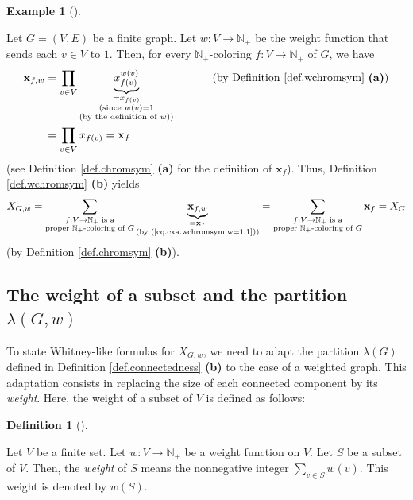 \documentclass[numbers=enddot,12pt,final,onecolumn,notitlepage]{scrartcl}%
\theoremstyle{definition}
\newtheorem{defi}[theo]{Definition}
\newenvironment{definition}[1][]
{\begin{defi}[#1]\begin{leftbar}}
{\end{leftbar}\end{defi}}
\newtheorem{exmp}[theo]{Example}
\newenvironment{example}[1][]
{\begin{exmp}[#1]\begin{leftbar}}
{\end{leftbar}\end{exmp}}
\let\sumnonlimits\sum
\let\prodnonlimits\prod
\renewcommand{\sum}{\sumnonlimits\limits}
\renewcommand{\prod}{\prodnonlimits\limits}
\begin{document}
\begin{example}
\label{exa.wchromsym.w=1}Let $G=\left(  V,E\right)  $ be a finite graph. Let
$w:V\rightarrow\mathbb{N}_{+}$ be the weight function that sends each $v\in V$
to $1$. Then, for every $\mathbb{N}_{+}$-coloring $f:V\rightarrow
\mathbb{N}_{+}$ of $G$, we have%
\begin{align}
\mathbf{x}_{f,w}  &  =\prod_{v\in V}\underbrace{x_{f\left(  v\right)
}^{w\left(  v\right)  }}_{\substack{=x_{f\left(  v\right)  }\\\text{(since
}w\left(  v\right)  =1\\\text{(by the definition of }w\text{))}}%
}\ \ \ \ \ \ \ \ \ \ \left(  \text{by Definition \ref{def.wchromsym}
\textbf{(a)}}\right) \nonumber\\
&  =\prod_{v\in V}x_{f\left(  v\right)  }=\mathbf{x}_{f}
\label{eq.exa.wchromsym.w=1.1}%
\end{align}
(see Definition \ref{def.chromsym} \textbf{(a)} for the definition of
$\mathbf{x}_{f}$). Thus, Definition \ref{def.wchromsym} \textbf{(b)} yields%
\[
X_{G,w}=\sum_{\substack{f:V\rightarrow\mathbb{N}_{+}\text{ is a}\\\text{proper
}\mathbb{N}_{+}\text{-coloring of }G}}\underbrace{\mathbf{x}_{f,w}%
}_{\substack{=\mathbf{x}_{f}\\\text{(by (\ref{eq.exa.wchromsym.w=1.1}))}%
}}=\sum_{\substack{f:V\rightarrow\mathbb{N}_{+}\text{ is a}\\\text{proper
}\mathbb{N}_{+}\text{-coloring of }G}}\mathbf{x}_{f}=X_{G}%
\]
(by Definition \ref{def.chromsym} \textbf{(b)}).
\end{example}

\subsection{The weight of a subset and the partition $\lambda\left(
G,w\right)  $}

To state Whitney-like formulas for $X_{G,w}$, we need to adapt the partition
$\lambda\left(  G\right)  $ defined in Definition \ref{def.connectedness}
\textbf{(b)} to the case of a weighted graph. This adaptation consists in
replacing the size of each connected component by its \emph{weight}. Here, the
weight of a subset of $V$ is defined as follows:

\begin{definition}
\label{def.weight-of-subset}Let $V$ be a finite set. Let $w:V\rightarrow
\mathbb{N}_{+}$ be a weight function on $V$. Let $S$ be a subset of $V$. Then,
the \emph{weight} of $S$ means the nonnegative integer $\sum_{v\in S}w\left(
v\right)  $. This weight is denoted by $w\left(  S\right)  $.
\end{definition}
\end{document}
